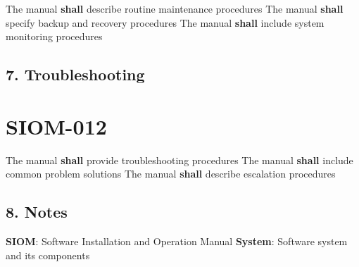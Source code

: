 The manual \textbf{shall} describe routine maintenance procedures
The manual \textbf{shall} specify backup and recovery procedures
The manual \textbf{shall} include system monitoring procedures

\subsection{7. Troubleshooting}

\section{SIOM-012}\label{SIOM-012}

The manual \textbf{shall} provide troubleshooting procedures
The manual \textbf{shall} include common problem solutions
The manual \textbf{shall} describe escalation procedures

\subsection{8. Notes}
\textbf{SIOM}: Software Installation and Operation Manual
\textbf{System}: Software system and its components


